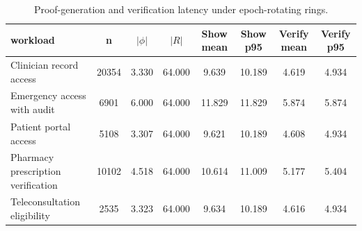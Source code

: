 \begin{table}[htbp]
\centering
\caption{Proof-generation and verification latency under epoch-rotating rings.}
\label{tab:proof-verify}
\begin{tabular}{@{}lccccccc@{}}
\toprule
workload & n & $|\phi|$ & $|R|$ & Show mean & Show p95 & Verify mean & Verify p95 \\
\midrule
Clinician record access & 20354 & 3.330 & 64.000 & 9.639 & 10.189 & 4.619 & 4.934 \\
Emergency access with audit & 6901 & 6.000 & 64.000 & 11.829 & 11.829 & 5.874 & 5.874 \\
Patient portal access & 5108 & 3.307 & 64.000 & 9.621 & 10.189 & 4.608 & 4.934 \\
Pharmacy prescription verification & 10102 & 4.518 & 64.000 & 10.614 & 11.009 & 5.177 & 5.404 \\
Teleconsultation eligibility & 2535 & 3.323 & 64.000 & 9.634 & 10.189 & 4.616 & 4.934 \\
\bottomrule
\end{tabular}
\end{table}
